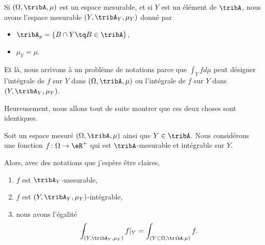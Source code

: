 \begin{normaltext}
    Si \( (\Omega,\tribA,\mu)\) est un espace mesurable, et si \( Y\) est un élément de \( \tribA\), nous avons l'espace mesurable \( (Y,\tribA_Y,\mu_Y)\) donné par
	\begin{itemize}
		\item \( \tribA_y=\{ B\cap Y\tq B\in \tribA \}\),
		\item \( \mu_Y=\mu\).
	\end{itemize}
	Et là, nous arrivons à un problème de notations parce que \( \int_Yfd\mu\) peut désigner l'intégrale de \( f\) sur \( Y\) dans \( (\Omega,\tribA,\mu)\) ou l'intégrale de \( f\) sur \( Y\) dans \( (Y,\tribA_Y,\mu_Y)\).

	Heureusement, nous allons tout de suite montrer que ces deux choses sont identiques.
\end{normaltext}


\begin{lemma}
	Soit un espace mesuré \( (\Omega,\tribA,\mu)\) ainsi que \( Y\in\tribA\). Nous considérons une fonction \( f\colon \Omega\to \eR^+\) qui est \( \tribA\)-mesurable et intégrable sur \( Y\).

	Alors, avec des notations que j'espère être claires,
	\begin{enumerate}
		\item
		      \( f\) est \( \tribA_Y\)-mesurable,
		\item
		      \( f\) est \( (Y,\tribA_Y,\mu_Y)\)-intégrable,
		\item
		      nous avons l'égalité
		      \begin{equation}
			      \int_{(Y,\tribA_Y,\mu_Y)}f|_Y=\int_{(Y\subset \Omega,\tribA,\mu)}f.
		      \end{equation}
	\end{enumerate}
\end{lemma}

